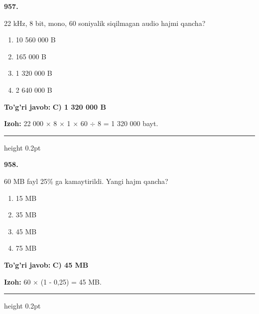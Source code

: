 \documentclass[10pt,a4paper,oneside]{article}
\begin{document}
\noindent\textbf{\color{ink}957.}
\par
22 kHz, 8 bit, mono, 60 soniyalik siqilmagan audio hajmi qancha?
\begin{enumerate}[label=\Alph*),leftmargin=9mm]
\item 10 560 000 B
\item 165 000 B
\item 1 320 000 B
\item 2 640 000 B
\end{enumerate}
\begin{tcolorbox}[enhanced,breakable,colback=teal!4,colframe=teal!50!black,boxrule=0.5pt,arc=1.1mm,left=3mm,right=3mm,top=1.7mm,bottom=1.7mm,before skip=2mm,after skip=2mm]
\textbf{\color{teal}To'g'ri javob:} \textbf{C) 1 320 000 B}
\par\smallskip
\textbf{Izoh:} 22 000 \ensuremath{\times} 8 \ensuremath{\times} 1 \ensuremath{\times} 60 \ensuremath{\div} 8 = 1 320 000 bayt.
\end{tcolorbox}
\vspace{2mm}\hrule height 0.2pt \vspace{3mm}

\noindent\textbf{\color{ink}958.}
\par
60 MB fayl 25\% ga kamaytirildi. Yangi hajm qancha?
\begin{enumerate}[label=\Alph*),leftmargin=9mm]
\item 15 MB
\item 35 MB
\item 45 MB
\item 75 MB
\end{enumerate}
\begin{tcolorbox}[enhanced,breakable,colback=teal!4,colframe=teal!50!black,boxrule=0.5pt,arc=1.1mm,left=3mm,right=3mm,top=1.7mm,bottom=1.7mm,before skip=2mm,after skip=2mm]
\textbf{\color{teal}To'g'ri javob:} \textbf{C) 45 MB}
\par\smallskip
\textbf{Izoh:} 60 \ensuremath{\times} (1 - 0,25) = 45 MB.
\end{tcolorbox}
\vspace{2mm}\hrule height 0.2pt \vspace{3mm}
\end{document}

